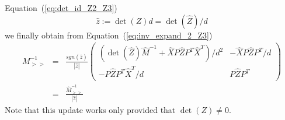 \documentclass[a4paper]{article}
\begin{document}
Equation~(\ref{eq:det_id_Z2_Z3})
\begin{equation}
\label{def:new_denom_Z3}
\hat{z}:=\det\left(Z\right) d = \det(\hat{Z}) /d
\end{equation}
we finally obtain from Equation~(\ref{eq:inv_expand_2_Z3})
\begin{eqnarray}
M_{>>}^{-1}&=&
\frac{sgn\left(\hat{z}\right)}{\left|\hat{z}\right|}
\left(
\begin{array}{c|c}
(\det(\hat{Z})\hat{M}^{-1}+\hat{X}P\hat{Z}P^{T}\hat{X}^{T})/d^{2} &
-\hat{X}P\hat{Z}P^{T}/d \\
\hline
-P\hat{Z}P^{T}\hat{X}^{T}/d & P\hat{Z}P^{T}
\end{array}
\right) 
\nonumber \\
&=&
\frac{\hat{M}_{>>}^{-1}}{\left|\hat{z}\right|}
\end{eqnarray}
Note that this update works only provided that $\det(Z) \neq 0$.
\end{document}
